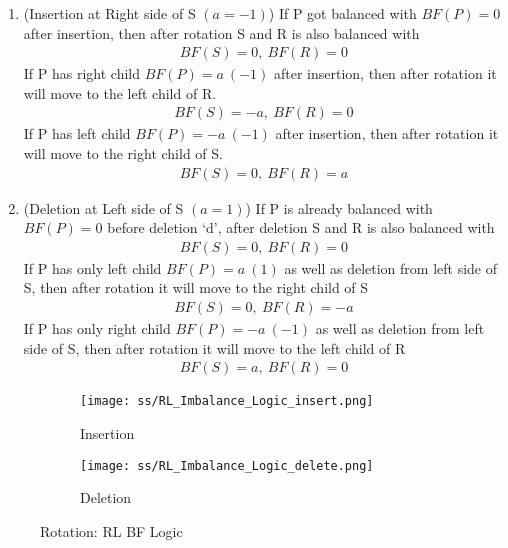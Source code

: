 \documentclass{article}
\begin{document}
    \begin{enumerate}
        \item (Insertion at Right side of S $(a=-1)$) \newline
        If P got balanced with $BF(P)=0$ after insertion, then after rotation S and R is also balanced with 
        \begin{align}
            BF(S)=0, \: BF(R)=0
        \end{align}
        If P has right child $BF(P)=a \: (-1)$ after insertion, then after rotation it will move to the left child of R.  
        \begin{align}
            BF(S)=-a, \: BF(R)=0
        \end{align}
        If P has left child $BF(P)=-a \: (-1)$ after insertion, then after rotation it will move to the right child of S.
         \begin{align}
            BF(S)=0, \: BF(R)=a
        \end{align}
        
        \item (Deletion at Left side of S $(a=1)$) \newline
        If P is already balanced with $BF(P)=0$ before deletion `d', after deletion S and R is also balanced with
        \begin{align}
            BF(S)=0, \: BF(R)=0
        \end{align}
        If P has only left child $BF(P)=a \: (1)$ as well as deletion from left side of S, then after rotation it will move to the right child of S
        \begin{align}
            BF(S)=0, \: BF(R)=-a
        \end{align}
        If P has only right child $BF(P)=-a \:(-1)$ as well as deletion from left side of S, then after rotation it will move to the left child of R  
        \begin{align}
            BF(S)=a, \: BF(R)=0
        \end{align}
    \end{enumerate}
    
    \begin{figure}[H]
        \begin{subfigure}{0.5\textwidth}
            \centering
            \texttt{[image: ss/RL\_Imbalance\_Logic\_insert.png]}
            \caption{Insertion}
        \end{subfigure}
        \begin{subfigure}{0.5\textwidth}
            \centering
            \texttt{[image: ss/RL\_Imbalance\_Logic\_delete.png]}
            \caption{Deletion}
        \end{subfigure}
        \caption{Rotation: RL BF Logic}
    \label{fig:RL_Imbalance_Logic}
    \end{figure}
\end{document}
